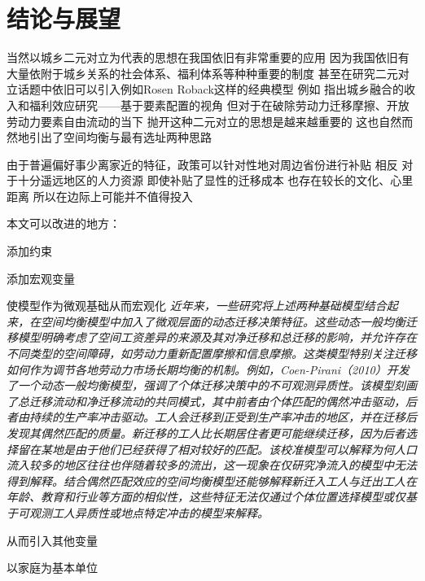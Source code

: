 \documentclass[a4paper, zihao=-4, fontset = mac, oneside]{ctexbook} %
\begin{document}
\chapter{结论与展望}

当然以城乡二元对立为代表的思想在我国依旧有非常重要的应用 因为我国依旧有大量依附于城乡关系的社会体系、福利体系等种种重要的制度
甚至在研究二元对立话题中依旧可以引入例如Rosen Roback这样的经典模型
例如 
\textcite{GuoDongMeiChengXiangRongHeDeShouRuHeFuLiXiaoYingYanJiuJiYuYaoSuPeiZhiDeShiJiao2023}指出城乡融合的收入和福利效应研究——基于要素配置的视角
但对于在破除劳动力迁移摩擦、开放劳动力要素自由流动的当下
抛开这种二元对立的思想是越来越重要的
这也自然而然地引出了空间均衡与最有选址两种思路



由于普遍偏好事少离家近的特征，政策可以针对性地对周边省份进行补贴
相反 对于十分遥远地区的人力资源 即使补贴了显性的迁移成本 也存在较长的文化、心里距离 所以在边际上可能并不值得投入



本文可以改进的地方：

添加约束

添加宏观变量

使模型作为微观基础从而宏观化
\textit{近年来，一些研究将上述两种基础模型结合起来，在空间均衡模型中加入了微观层面的动态迁移决策特征。这些动态一般均衡迁移模型明确考虑了空间工资差异的来源及其对净迁移和总迁移的影响，并允许存在不同类型的空间障碍，如劳动力重新配置摩擦和信息摩擦。这类模型特别关注迁移如何作为调节各地劳动力市场长期均衡的机制。例如，Coen-Pirani（2010）开发了一个动态一般均衡模型，强调了个体迁移决策中的不可观测异质性。该模型刻画了总迁移流动和净迁移流动的共同模式，其中前者由个体匹配的偶然冲击驱动，后者由持续的生产率冲击驱动。工人会迁移到正受到生产率冲击的地区，并在迁移后发现其偶然匹配的质量。新迁移的工人比长期居住者更可能继续迁移，因为后者选择留在某地是由于他们已经获得了相对较好的匹配。该校准模型可以解释为何人口流入较多的地区往往也伴随着较多的流出，这一现象在仅研究净流入的模型中无法得到解释。结合偶然匹配效应的空间均衡模型还能够解释新迁入工人与迁出工人在年龄、教育和行业等方面的相似性，这些特征无法仅通过个体位置选择模型或仅基于可观测工人异质性或地点特定冲击的模型来解释。}

从而引入其他变量

以家庭为基本单位


\newpage
\appendix
\end{document}
